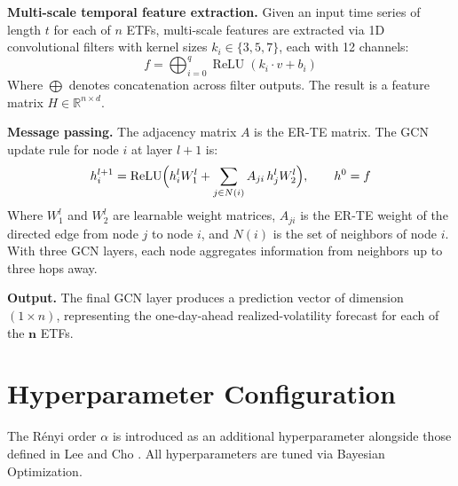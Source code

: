 \documentclass[12pt,oneside]{report}
\DeclareMathOperator{\ReLU}{ReLU}
\begin{document}
\textbf{Multi-scale temporal feature extraction.} Given an input time
series of length $t$ for each of $n$ ETFs, multi-scale features are
extracted via 1D convolutional filters with kernel sizes
$k_{i} \in \{3, 5, 7\}$, each with 12 channels:
\[
  f = \bigoplus_{i=0}^{q} \ReLU\left(k_{i} \cdot v + b_{i}\right)
\]
Where $\bigoplus$ denotes concatenation across filter outputs. The result
is a feature matrix $H \in \mathbb{R}^{n \times d}$.

\textbf{Message passing.} The adjacency matrix $A$ is the ER-TE matrix.
The GCN update rule for node $i$ at layer $l + 1$ is:
\[
  h_{i}^{l+1} = \ReLU\Bigl(h_{i}^{l} W_{1}^{l}
      + \sum_{j \in N(i)} A_{ji}\, h_{j}^{l} W_{2}^{l}\Bigr),
  \qquad h^{0} = f
\]
Where $W_{1}^{l}$ and $W_{2}^{l}$ are learnable weight matrices, $A_{ji}$
is the ER-TE weight of the directed edge from node $j$ to node $i$, and
$N(i)$ is the set of neighbors of node $i$. With three GCN layers, each
node aggregates information from neighbors up to three hops away.

\textbf{Output.} The final GCN layer produces a prediction vector of
dimension $(1 \times n)$, representing the one-day-ahead
realized-volatility forecast for each of the $\mathbf{n}$ ETFs.

\section{Hyperparameter Configuration}

The Rényi order $\alpha$ is introduced as an additional hyperparameter
alongside those defined in Lee and Cho \cite{lee2025}. All
hyperparameters are tuned via Bayesian Optimization.
\end{document}
